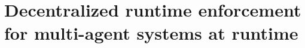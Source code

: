 

\newcommand*{\defeq}{\stackrel{\text{def}}{=}}
\newcommand{\Agents}{\mathcal{U}}
\newcommand{\Time}{\mathbb{T}}
\newcommand{\Actions}{\Sigma} 
\newcommand{\Elabel}{\mathcal{Y}}
\newcommand{\Vlabel}{\mathcal{X}}
\newcommand{\Bool}{\mathbb{B}}
\newcommand{\Safety}{\varphi}
\newcommand{\Lang}{\mathcal{L}}
\newcommand{\Power}{\mathcal{P}}
\newcommand{\Replace}{\mathcal{R}}
\newcommand\dhrightarrow{%
  \mathrel{\ooalign{$\rightarrow$\cr%
  $\mkern3.5mu\rightarrow$}}
}
\newcommand\dhxrightarrow[2][]{%
  \mathrel{\ooalign{$\xrightarrow[#1\mkern4mu]{#2\mkern4mu}$\cr%
  \hidewidth$\rightarrow\mkern4mu$}}
}

\newcommand{\Dj}[1]{\textcolor{blue}{#1}}
\newcommand{\suda}[1]{\textcolor{red}{#1}}

\newcommand\Square[1]{+(-#1,-#1) rectangle +(#1,#1)}

\chapter{Decentralized runtime enforcement for multi-agent systems at runtime}











